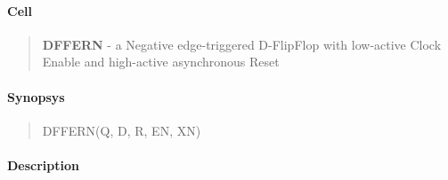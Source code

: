 \label{DFFERN}
\paragraph{Cell}
\begin{quote}
    \textbf{DFFERN} - a Negative edge-triggered D-FlipFlop with low-active Clock Enable and high-active asynchronous Reset
\end{quote}

\paragraph{Synopsys}
\begin{quote}
    DFFERN(Q, D, R, EN, XN)
\end{quote}

\paragraph{Description}

%

